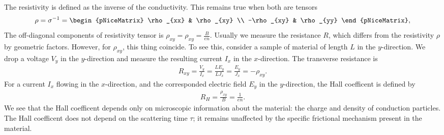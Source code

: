 \documentclass{report}
\begin{document}
The resistivity is defined as the inverse of the conductivity. This remains true when both are tensors
\begin{equation}
	\begin{aligned}
		\rho = \sigma^{-1} =
		\begin{pNiceMatrix}
			\rho_{xx}  & \rho_{xy} \\
			-\rho_{xy} & \rho_{yy}
		\end{pNiceMatrix}
	\end{aligned},
\end{equation}
The off-diagonal components of resistivity tensor is $\rho_{xy} = \rho_{xy} = \tfrac{B}{en}$. Usually we measure the resistance $R$, which differs from the resistivity $\rho$ by geometric factors. However, for $\rho_{xy}$, this thing coincide. To see this, consider a sample of material of length $L$ in the $y$-direction. We drop a voltage $V_{y}$ in the $y$-direction and measure the resulting current $I_{x}$ in the $x$-direction. The transverse resistance is
\begin{gather}
	R_{xy} = \frac{V_{y}}{I_{x}} = \frac{L E_{y}}{L J_{x}} = \frac{E_{y}}{J_{x}} = -\rho_{xy}.
\end{gather}
For a current $I_{x}$ flowing in the $x$-direction, and the corresponded electric field $E_{y}$ in the $y$-direction, the Hall coefficent is defined by
\begin{gather}
	R_{H} = \frac{\rho_{xy}}{B} = \frac{1}{en} .
\end{gather}
We see that the Hall coefficent depends only on microscopic information about the material: the charge and density of conduction particles. The Hall coefficent does not depend on the scattering time $\tau$; it remains unaffected by the specific frictional mechanism present in the material.
\end{document}
